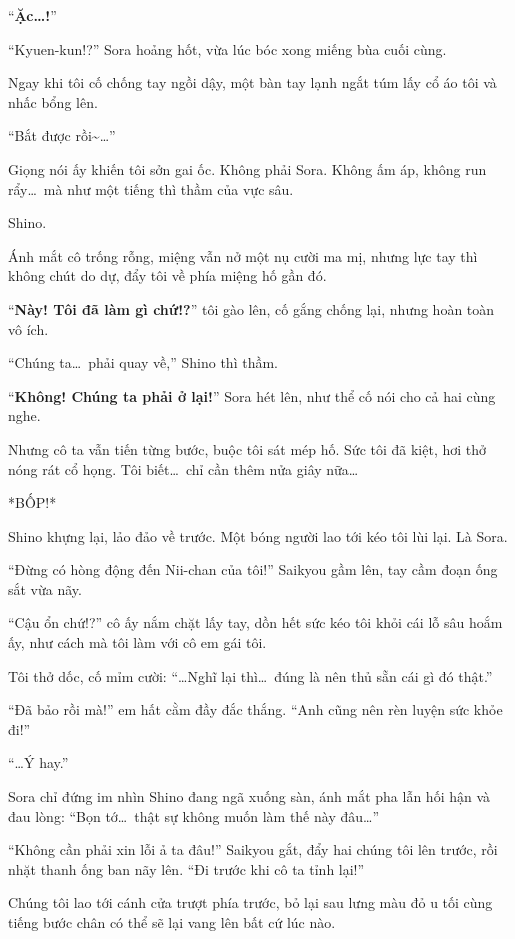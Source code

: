 \documentclass[../main.tex]{subfiles}
\begin{document}
``\textbf{Ặc\dots!}''

``Kyuen-kun!?'' Sora hoảng hốt, vừa lúc bóc xong miếng bùa cuối cùng.

Ngay khi tôi cố chống tay ngồi dậy, một bàn tay lạnh ngắt túm lấy cổ áo tôi và nhấc bổng lên.

``Bắt được rồi\~{}\dots''

Giọng nói ấy khiến tôi sởn gai ốc. Không phải Sora. Không ấm áp, không run rẩy\dots\ mà như một tiếng thì thầm của vực sâu.

Shino.

Ánh mắt cô trống rỗng, miệng vẫn nở một nụ cười ma mị, nhưng lực tay thì không chút do dự, đẩy tôi về phía miệng hố gần đó.


``\textbf{Này! Tôi đã làm gì chứ!?}'' tôi gào lên, cố gắng chống lại, nhưng hoàn toàn vô ích.

``Chúng ta\dots\ phải quay về,'' Shino thì thầm.

``\textbf{Không! Chúng ta phải ở lại!}'' Sora hét lên, như thể cố nói cho cả hai cùng nghe.

Nhưng cô ta vẫn tiến từng bước, buộc tôi sát mép hố. Sức tôi đã kiệt, hơi thở nóng rát cổ họng. Tôi biết\dots\ chỉ cần thêm nửa giây nữa\dots

*BỐP!*

Shino khựng lại, lảo đảo về trước. Một bóng người lao tới kéo tôi lùi lại. Là Sora.

``Đừng có hòng động đến Nii-chan của tôi!'' Saikyou gầm lên, tay cầm đoạn ống sắt vừa nãy.

``Cậu ổn chứ!?'' cô ấy nắm chặt lấy tay, dồn hết sức kéo tôi khỏi cái lỗ sâu hoắm ấy, như cách mà tôi làm với cô em gái tôi.

Tôi thở dốc, cố mỉm cười: ``\dots Nghĩ lại thì\dots\ đúng là nên thủ sẵn cái gì đó thật.''

``Đã bảo rồi mà!'' em hất cằm đầy đắc thắng. ``Anh cũng nên rèn luyện sức khỏe đi!''

``\dots Ý hay.''

Sora chỉ đứng im nhìn Shino đang ngã xuống sàn, ánh mắt pha lẫn hối hận và đau lòng: ``Bọn tớ\dots\ thật sự không muốn làm thế này đâu\dots''

``Không cần phải xin lỗi ả ta đâu!'' Saikyou gắt, đẩy hai chúng tôi lên trước, rồi nhặt thanh ống ban nãy lên. ``Đi trước khi cô ta tỉnh lại!''

Chúng tôi lao tới cánh cửa trượt phía trước, bỏ lại sau lưng màu đỏ u tối cùng tiếng bước chân có thể sẽ lại vang lên bất cứ lúc nào.
\end{document}
